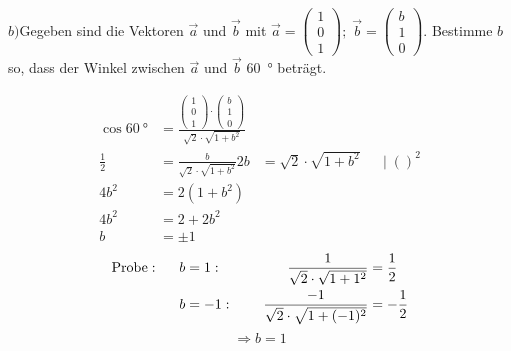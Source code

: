 \documentclass{article}
\begin{document}
    \begin{boxx}[DarkBlue]{}
        $b)$\hspace*{3mm}Gegeben sind die Vektoren $\vec{a}$ und $\vec{b}$ mit $\displaystyle \vec{a} = \begin{pmatrix}1\\0\\1\end{pmatrix};\;\vec{b}=\begin{pmatrix}b\\1\\0\end{pmatrix}$. 
        Bestimme $b$ so, dass der Winkel zwischen $\vec{a}$ und $\vec{b}$ \qty{60}{\degree} beträgt.

        \begin{align*}
            \cos{\qty{60}{\degree}} &= \frac{\begin{pmatrix}1\\0\\1\end{pmatrix}\cdot \begin{pmatrix}b\\1\\0\end{pmatrix}}{\sqrt{2}\cdot \sqrt{1+b^2}} \\
            \frac{1}{2} &= \frac{b}{\sqrt{2}\cdot\sqrt{1+b^2}} 
            2b &= \sqrt{2}\cdot \sqrt{1+b^2}&&|\;()^2\\
            4b^2 &= 2\left(1+b^2\right) \\
            4b^2 &= 2 + 2b^2 \\
            b &= \pm 1
        \end{align*}
        \begin{align*}
            &&&&\textrm{Probe}: \hspace*{5mm} b&=1:\hspace*{5mm}& \frac{1}{\sqrt{2}\cdot\sqrt{1+1^2}} &= \frac{1}{2} &&&&\\
            &&&& b&=-1:\hspace*{5mm}&\frac{-1}{\sqrt{2}\cdot\sqrt{1+(-1)^2}} &= -\frac{1}{2} 
        \end{align*}
        \[\Rightarrow b = 1\]
    \end{boxx}
\end{document}
